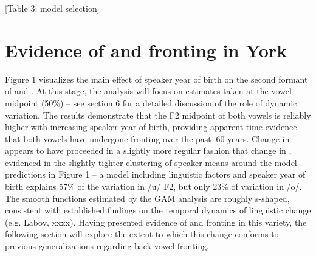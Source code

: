 \documentclass[12pt]{article}
\begin{document}
[Table 3: model selection]

\section{Evidence of  and  fronting in York}
Figure 1 visualizes the main effect of speaker year of birth on the second formant of  and . At this stage, the analysis will focus on estimates taken at the vowel midpoint (50\%) -- see section 6 for a detailed discussion of the role of dynamic variation. The results demonstrate that the F2 midpoint of both vowels is reliably higher with increasing speaker year of birth, providing apparent-time evidence that both vowels have undergone fronting over the past $~$60 years. Change in  appears to have proceeded in a slightly more regular fashion that change in , evidenced in the slightly tighter clustering of speaker means around the model predictions in Figure 1 -- a model including linguistic factors and speaker year of birth explains 57\% of the variation in /u/ F2, but only 23\% of variation in /o/. The smooth functions estimated by the GAM analysis are roughly s-shaped, consistent with established findings on the temporal dynamics of linguistic change (e.g. Labov, xxxx). Having presented evidence of  and  fronting in this variety, the following section will explore the extent to which this change conforms to previous generalizations regarding back vowel fronting.
\end{document}
